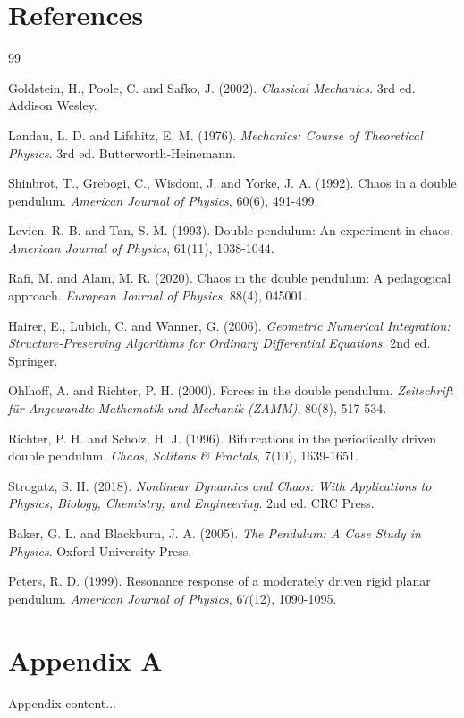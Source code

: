 \documentclass[12pt, a4paper, twoside]{article}
\begin{document}
\section{References}
\begin{thebibliography}{99}
  
  Goldstein, H., Poole, C. and Safko, J. (2002). \emph{Classical Mechanics}. 3rd ed. Addison Wesley.
  
  Landau, L. D. and Lifshitz, E. M. (1976). \emph{Mechanics: Course of Theoretical Physics}. 3rd ed. Butterworth-Heinemann.
  
  Shinbrot, T., Grebogi, C., Wisdom, J. and Yorke, J. A. (1992). Chaos in a double pendulum. \emph{American Journal of Physics}, 60(6), 491-499.
  
  Levien, R. B. and Tan, S. M. (1993). Double pendulum: An experiment in chaos. \emph{American Journal of Physics}, 61(11), 1038-1044.
  
  Rafi, M. and Alam, M. R. (2020). Chaos in the double pendulum: A pedagogical approach. \emph{European Journal of Physics}, 88(4), 045001.
  
  Hairer, E., Lubich, C. and Wanner, G. (2006). \emph{Geometric Numerical Integration: Structure-Preserving Algorithms for Ordinary Differential Equations}. 2nd ed. Springer.
  
  Ohlhoff, A. and Richter, P. H. (2000). Forces in the double pendulum. \emph{Zeitschrift für Angewandte Mathematik und Mechanik (ZAMM)}, 80(8), 517-534.
  
  Richter, P. H. and Scholz, H. J. (1996). Bifurcations in the periodically driven double pendulum. \emph{Chaos, Solitons \& Fractals}, 7(10), 1639-1651.
  
  Strogatz, S. H. (2018). \emph{Nonlinear Dynamics and Chaos: With Applications to Physics, Biology, Chemistry, and Engineering}. 2nd ed. CRC Press.
  
  Baker, G. L. and Blackburn, J. A. (2005). \emph{The Pendulum: A Case Study in Physics}. Oxford University Press.
  
  Peters, R. D. (1999). Resonance response of a moderately driven rigid planar pendulum. \emph{American Journal of Physics}, 67(12), 1090-1095.

\end{thebibliography}

\appendix
\section{Appendix A}
  Appendix content...
\end{document}
